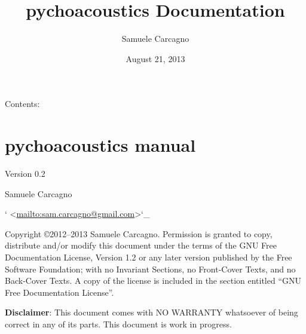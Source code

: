 \documentclass[a4paper,12pt,english]{sphinxmanual}
\title{pychoacoustics Documentation}
\date{August 21, 2013}
\author{Samuele Carcagno}
\begin{document}
\maketitle
\tableofcontents
{}\label{index::doc}


Contents:


\chapter{pychoacoustics manual}
\label{intro:pychoacoustics-manual}\label{intro::doc}\label{intro:welcome-to-pychoacoustics-s-documentation}
Version 0.2

Samuele Carcagno

{}` \textless{}\href{mailto:sam.carcagno@gmail.com}{mailto:sam.carcagno@gmail.com}\textgreater{}{}`\_

Copyright ©2012–2013 Samuele Carcagno.
Permission is granted to copy, distribute and/or modify this document
under the terms of the GNU Free Documentation License, Version 1.2 or
any later version published by the Free Software Foundation; with no
Invariant Sections, no Front-Cover Texts, and no Back-Cover Texts. A
copy of the license is included in the section entitled “GNU Free
Documentation License”.

\textbf{Disclaimer}: This document comes with NO WARRANTY whatsoever of being
correct in any of its parts. This document is work in progress.
\end{document}
